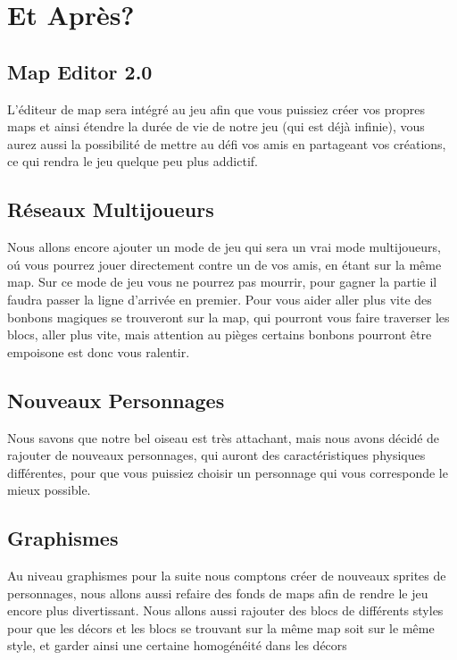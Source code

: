 \documentclass [11pt]{report}
\begin{document}
	
\chapter{Et Après?}
	\section{Map Editor 2.0}
	L'éditeur de map sera intégré au jeu afin que vous puissiez créer vos propres maps et ainsi étendre la durée de vie de notre jeu (qui est déjà infinie), vous aurez aussi la possibilité de mettre au défi vos amis en partageant vos créations, ce qui rendra le jeu quelque peu plus addictif.
	
	
		
		\vspace{10mm}
	
	
	
	\section{Réseaux Multijoueurs}
	Nous allons encore ajouter un mode de jeu qui sera un vrai mode multijoueurs, o\'u vous pourrez jouer directement contre un de vos amis, en \'etant sur la m\^eme map. Sur ce mode de jeu vous ne pourrez pas mourrir, pour gagner la partie il faudra passer la ligne d'arriv\'ee en premier. Pour vous aider aller plus vite des bonbons magiques se trouveront sur la map, qui pourront vous faire traverser les blocs, aller plus vite, mais attention au pi\`eges certains bonbons pourront \^etre empoisone est donc vous ralentir.

	
	\vspace{10mm}



	\section{Nouveaux Personnages}
	Nous savons que notre bel oiseau est très attachant, mais nous avons décidé de rajouter de nouveaux personnages, qui auront des caractéristiques physiques différentes, pour que vous puissiez choisir un personnage qui vous corresponde le mieux possible.
	
	
		
		\vspace{10mm}
	
	
	
	\section{Graphismes}
	Au niveau graphismes pour la suite nous comptons cr\'eer de nouveaux sprites de personnages, nous allons aussi refaire des fonds de maps afin de rendre le jeu encore plus divertissant. Nous allons aussi rajouter des blocs de différents styles pour que les décors et les blocs se trouvant sur la même map soit sur le même style, et garder ainsi une certaine homogénéité dans les décors
\newpage
\end{document}
